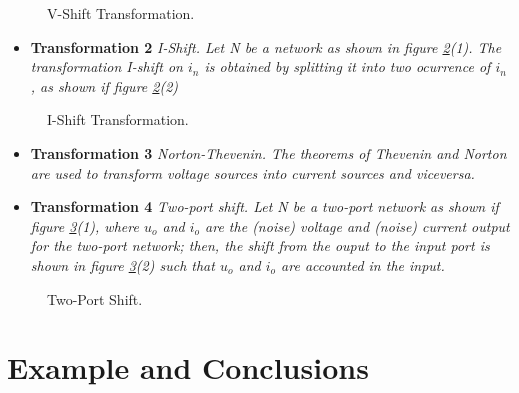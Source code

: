 \documentclass[letterpaper]{ecctd01}
\begin{document}
\begin{figure}[hbtp]
\vspace{-2mm}
\centerline{
\epsfxsize=30mm
}
\caption{V-Shift Transformation.}
\label{v-shift}
\end{figure} 

\begin{itemize}
\item {\bf Transformation 2} {\it I-Shift. Let N be a network as shown in figure {\ref{i-shift}(1)}. The transformation I-shift on $i_n$ is obtained by splitting it into two ocurrence of $i_n$, as shown if figure {\ref{i-shift}(2)}}
\end{itemize}

\begin{figure}[hbtp]
\vspace{-2mm}
\centerline{
\epsfxsize=25mm
}
\caption{I-Shift Transformation.}
\vspace{-5mm}
\label{i-shift}
\end{figure} 

\begin{itemize}
\item {\bf Transformation 3} {\it Norton-Thevenin. The theorems of Thevenin and Norton are used to transform voltage sources into current sources and viceversa.}
\end{itemize}


\begin{itemize}
\item {\bf Transformation 4} {\it Two-port shift. Let N be a two-port network as shown if figure {\ref{2port}(1)}, where $u_o$ and $i_o$ are the (noise) voltage and (noise) current output for the two-port network; then, the shift from the ouput to the input port is shown in figure {\ref{2port}(2)} such that $u_o$ and $i_o$ are accounted in the input.}
\end{itemize} 

\begin{figure}[hbtp]
\vspace{-2mm}
\centerline{
\epsfxsize=75mm
}
\caption{Two-Port Shift.}
\label{2port}
\end{figure} 

\section{Example and Conclusions}
\end{document}
